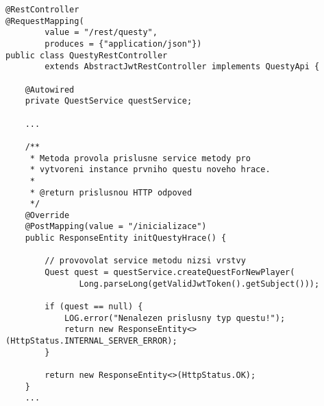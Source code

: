 \documentclass[12pt]{article}
\begin{document}
\begin{lstlisting}
@RestController
@RequestMapping(
        value = "/rest/questy",
        produces = {"application/json"})
public class QuestyRestController
        extends AbstractJwtRestController implements QuestyApi {
    
    @Autowired
    private QuestService questService;
    
    ...
    
    /**
     * Metoda provola prislusne service metody pro
     * vytvoreni instance prvniho questu noveho hrace.
     *
     * @return prislusnou HTTP odpoved
     */
    @Override
    @PostMapping(value = "/inicializace")
    public ResponseEntity initQuestyHrace() {

        // provovolat service metodu nizsi vrstvy
        Quest quest = questService.createQuestForNewPlayer(
               Long.parseLong(getValidJwtToken().getSubject()));

        if (quest == null) {
            LOG.error("Nenalezen prislusny typ questu!");
            return new ResponseEntity<>(HttpStatus.INTERNAL_SERVER_ERROR);
        }

        return new ResponseEntity<>(HttpStatus.OK);
    }
    ...
    
\end{lstlisting}

\end{document}
